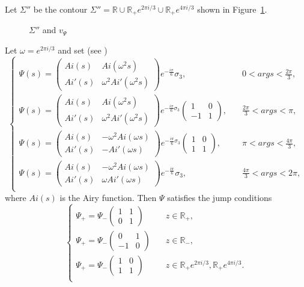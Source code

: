 \documentclass{amsart}
\theoremstyle{definition}
\theoremstyle{remark}
\numberwithin{equation}{section}
\newcommand{\R}{\mathbb R}
\begin{document}
Let $\Sigma''$ be the contour $\Sigma''=\R\cup\R_+e^{2\pi i/3}\cup\R_+e^{4\pi i/3}$ 
shown in Figure~\ref{fig-Sigma2}.
\begin{figure}[ht]
 \centerline{}
 \caption{$\Sigma''$ and $v_{\Psi}$}\label{fig-Sigma2}
\end{figure}
Let $\omega=e^{2\pi i/3}$ and set (see \cite{DZ})
\begin{equation}
  \begin{cases}
        \Psi(s)=\begin{pmatrix}Ai(s)&Ai(\omega^2s)\\
Ai'(s)&\omega^2Ai'(\omega^2s) \end{pmatrix}
e^{-\frac{i\pi}{6}}\sigma_3, &\quad 0< arg s < \frac{2\pi}{3},\\
        \Psi(s)=\begin{pmatrix}Ai(s)&Ai(\omega^2s)\\
Ai'(s)&\omega^2Ai'(\omega^2s) \end{pmatrix}
e^{-\frac{i\pi}{6}\sigma_3}\begin{pmatrix}1&0\\-1&1\end{pmatrix}, 
&\quad \frac{2\pi}{3}< arg s <\pi, \\
        \Psi(s)=\begin{pmatrix}Ai(s)&-\omega^2Ai(\omega s)\\
Ai'(s)&-Ai'(\omega s) \end{pmatrix}
e^{-\frac{i\pi}{6}\sigma_3}\begin{pmatrix}1&0\\1&1\end{pmatrix}, 
&\quad \pi < arg s < \frac{4\pi}{3}, \\
        \Psi(s)=\begin{pmatrix}Ai(s)&-\omega^2Ai(\omega s)\\
Ai'(s)&\omega Ai'(\omega s) \end{pmatrix}
e^{-\frac{i\pi}{6}}\sigma_3, &\quad \frac{4\pi}{3}<arg s <2\pi,\\
\end{cases}
\end{equation}
where $Ai(s)$ is the Airy function.
Then $\Psi$ satisfies the jump conditions 
\begin{equation}
  \begin{cases}
        \Psi_+=\Psi_-\begin{pmatrix}1&1\\0&1\end{pmatrix}& \quad z\in \R_+,\\
        \Psi_+=\Psi_-\begin{pmatrix}0&1\\-1&0\end{pmatrix}& \quad z\in \R_-,\\
        \Psi_+=\Psi_-\begin{pmatrix}1&0\\1&1\end{pmatrix}& 
\quad z\in \R_+e^{2\pi i/3}, \R_+e^{4\pi i/3}.\\
  \end{cases}
\end{equation}
\end{document}
